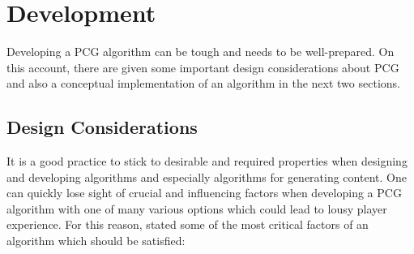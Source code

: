 \documentclass[MGS,Master,english]{twbook}%
\begin{document}
\section{Development} \label{pcgDevelopment}
Developing a \ac{PCG} algorithm can be tough and needs to be well-prepared. On this account, there are given some important design considerations about \ac{PCG} and also a conceptual implementation of an algorithm in the next two sections.

\subsection{Design Considerations}
It is a good practice to stick to desirable and required properties when designing and developing algorithms and especially algorithms for generating content. One can quickly lose sight of crucial and influencing factors when developing a \ac{PCG} algorithm with one of many various options which could lead to lousy player experience. For this reason, \citep{pcg::book} stated some of the most critical factors of an algorithm which should be satisfied:
\end{document}
